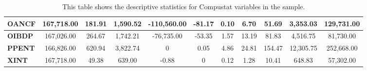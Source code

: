 {{\begin{table}[htb!]
{\begin{tabular}{|l|c|c|c|c|c|c|c|c|c|c|}
\textbf{OANCF}    & 167,718.00                          & 181.91                             & 1,590.52                          & -110,560.00                       & -81.17                            & 0.10                               & 6.70                               & 51.69                              & 3,353.03                           & 129,731.00                        \\ \hline
\textbf{OIBDP}    & 167,026.00                          & 264.67                             & 1,742.21                          & -76,735.00                        & -53.35                            & 1.57                               & 13.19                              & 81.83                              & 4,516.75                           & 81,730.00                         \\ \hline
\textbf{PPENT}    & 166,826.00                          & 620.94                             & 3,822.74                          & 0                                 & 0.05                              & 4.86                               & 24.81                              & 154.47                             & 12,305.75                          & 252,668.00                        \\ \hline
\textbf{XINT}     & 167,718.00                          & 49.38                              & 639.00                            & -0.88                             & 0                                 & 0.12                               & 1.28                               & 10.41                              & 648.83                             & 57,302.00                         \\ \hline
\end{tabular}}
\caption{This table shows the descriptive statistics for Compustat variables in the sample.}
\label{tab:CompustatDescribe}
\end{table}

}}
